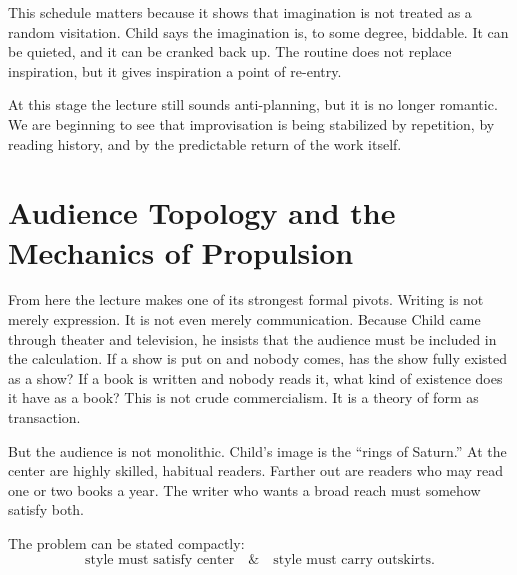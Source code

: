 This schedule matters because it shows that imagination is not treated as a random visitation. Child says the imagination is, to some degree, biddable. It can be quieted, and it can be cranked back up. The routine does not replace inspiration, but it gives inspiration a point of re-entry.

At this stage the lecture still sounds anti-planning, but it is no longer romantic. We are beginning to see that improvisation is being stabilized by repetition, by reading history, and by the predictable return of the work itself.

\section{Audience Topology and the Mechanics of Propulsion}

From here the lecture makes one of its strongest formal pivots. Writing is not merely expression. It is not even merely communication. Because Child came through theater and television, he insists that the audience must be included in the calculation. If a show is put on and nobody comes, has the show fully existed as a show? If a book is written and nobody reads it, what kind of existence does it have as a book? This is not crude commercialism. It is a theory of form as transaction.

But the audience is not monolithic. Child's image is the ``rings of Saturn.'' At the center are highly skilled, habitual readers. Farther out are readers who may read one or two books a year. The writer who wants a broad reach must somehow satisfy both.

\begin{figure}[h]
\centering
{}
\end{figure}

The problem can be stated compactly:
\begin{equation}
\text{style must satisfy center} \quad \& \quad \text{style must carry outskirts}.
\end{equation}

